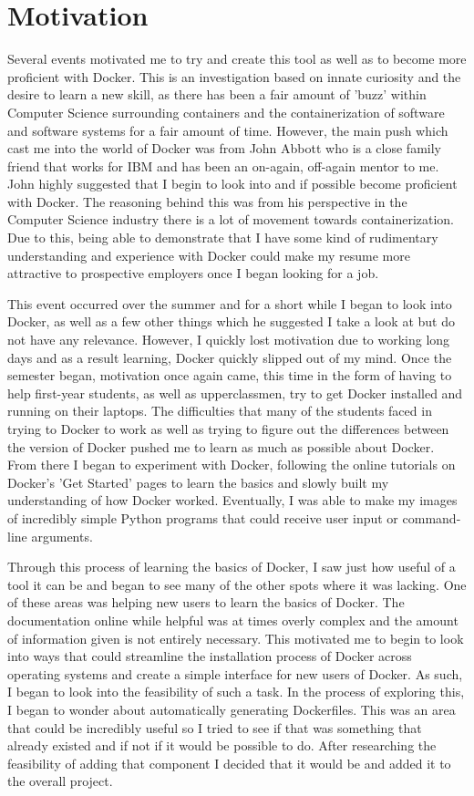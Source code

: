 \section{Motivation}
\label{sec:motivation}

Several events motivated me to try and create this tool as well as to become more proficient with Docker. This is an investigation based on innate curiosity and the desire to learn a new skill, as there has been a fair amount of 'buzz' within Computer Science surrounding containers and the containerization of software and software systems for a fair amount of time. However, the main push which cast me into the world of Docker was from John Abbott who is a close family friend that works for IBM and has been an on-again, off-again mentor to me. John highly suggested that I begin to look into and if possible become proficient with Docker. The reasoning behind this was from his perspective in the Computer Science industry there is a lot of movement towards containerization. Due to this, being able to demonstrate that I have some kind of rudimentary understanding and experience with Docker could make my resume more attractive to prospective employers once I began looking for a job.

This event occurred over the summer and for a short while I began to look into Docker, as well as a few other things which he suggested I take a look at but do not have any relevance. However, I quickly lost motivation due to working long days and as a result learning, Docker quickly slipped out of my mind. Once the semester began, motivation once again came, this time in the form of having to help first-year students, as well as upperclassmen, try to get Docker installed and running on their laptops. The difficulties that many of the students faced in trying to Docker to work as well as trying to figure out the differences between the version of Docker pushed me to learn as much as possible about Docker. From there I began to experiment with Docker, following the online tutorials on Docker's 'Get Started' pages to learn the basics and slowly built my understanding of how Docker worked. Eventually, I was able to make my images of incredibly simple Python programs that could receive user input or command-line arguments.

Through this process of learning the basics of Docker, I saw just how useful of a tool it can be and began to see many of the other spots where it was lacking. One of these areas was helping new users to learn the basics of Docker. The documentation online while helpful was at times overly complex and the amount of information given is not entirely necessary. This motivated me to begin to look into ways that could streamline the installation process of Docker across operating systems and create a simple interface for new users of Docker. As such, I began to look into the feasibility of such a task. In the process of exploring this, I began to wonder about automatically generating Dockerfiles. This was an area that could be incredibly useful so I tried to see if that was something that already existed and if not if it would be possible to do. After researching the feasibility of adding that component I decided that it would be and added it to the overall project.


